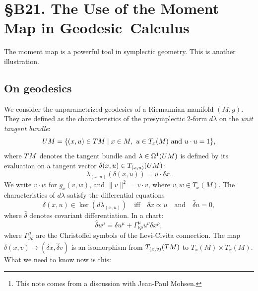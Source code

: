 
\chapter*{\S B21. The Use of the Moment Map in \hbox{Geodesic Calculus}}


\begin{abstract}
  A fact or two about geodesics,
  proved thanks to the moment map.%
  \footnote{This note comes from a discussion with Jean-Paul Mohsen.}
\end{abstract}


The moment map is a powerful tool in symplectic geometry.
This is another illustration.

\section{On geodesics}
\label{On-geodesics}

We consider the unparametrized geodesics of a Riemannian manifold $(M,g)$.
They are defined as the characteristics of the presymplectic $2$-form $d\lambda$ on the \emph{unit tangent bundle}:
$$%
  \UnitBundle{M} = \{(x,u) \in \TgtBundle M \mid x \in M,\ u \in T_x(M) \text{ and } u \cdot u = 1\},
  $$%
where $T M$ denotes the tangent bundle and $\lambda \in \Omega^1(U{M})$ is defined by its evaluation on a tangent vector $\delta(x,u) \in T_{(x,u)}(U{M})$:
$$%
  \lambda_{(x,u)}(\delta(x,u)) = u \cdot \delta x.
  $$%
We write $v \cdot w$ for $g_x(v,w)$,
and $\|v\|^2 = v \cdot v$,
where $v,w \in T_x(M)$.
The characteristics of $d\lambda$ satisfy the differential equations
$$%
  \delta(x,u) \in \ker(d\lambda_{(x,u)}) \quad \text{iff} \quad \delta x \propto u \quad \text{and} \quad \hat\delta u = 0,
  $$%
where $\hat\delta$ denotes covariant differentiation.
In a chart:
$$%
  \hat\delta u^\mu = \delta u^\mu + \Gamma^\mu_{\nu\rho} u^\nu \delta x^\rho,
  $$%
where $\Gamma^\mu_{\nu\rho}$ are the Christoffel symbols of the Levi-Civita connection.
The map $\delta(x,v) \mapsto (\delta x, \hat\delta v)$ is an isomorphism from $T_{(x,v)}(T M)$ to $T_x(M) \times T_x(M)$.
What we need to know now is this:

